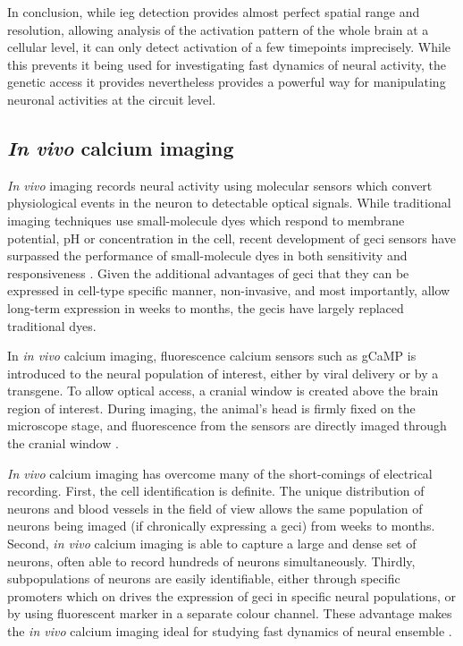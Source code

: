In conclusion, while \gls{ieg} detection provides almost perfect spatial range and resolution, allowing analysis of the activation pattern of the whole brain at a cellular level, it can only detect activation of a few timepoints imprecisely. While this prevents it being used for investigating fast dynamics of neural activity, the genetic access it provides nevertheless provides a powerful way for manipulating neuronal activities at the circuit level.


\subsection{\textit{In vivo} calcium imaging}

\textit{In vivo} imaging records neural activity using molecular sensors which convert physiological events in the neuron to detectable optical signals. While traditional imaging techniques use small-molecule dyes which respond to membrane potential, pH or  concentration in the cell, recent development of \gls{geci}  sensors have surpassed the performance of small-molecule  dyes in both sensitivity and responsiveness \citep{lutcke13}. Given the additional advantages of \gls{geci} that they can be expressed in cell-type specific manner, non-invasive, and most importantly, allow long-term expression in weeks to months, the \glspl{geci} have largely replaced traditional dyes. 

In \textit{in vivo} calcium imaging, fluorescence calcium sensors such as gCaMP is introduced to the neural population of interest, either by viral delivery or by a transgene. To allow optical access, a cranial window is created above the brain region of interest. During imaging, the animal's head is firmly fixed on the microscope stage, and fluorescence from the sensors are directly imaged through the cranial window \citep{lutcke13, yang17}. 

\textit{In vivo} calcium imaging has overcome many of the short-comings of electrical recording. First, the cell identification is definite. The unique distribution of neurons and blood vessels in the field of view allows the same population of neurons being imaged (if chronically expressing a \gls{geci}) from weeks to months. Second, \textit{in vivo} calcium imaging is able to capture a large and dense set of neurons, often able to record hundreds of neurons simultaneously. Thirdly, subpopulations of neurons are easily identifiable, either through specific promoters which on drives the expression of \gls{geci} in specific neural populations, or by using fluorescent marker in a separate colour channel. These advantage makes the \textit{in vivo} calcium imaging ideal for studying fast dynamics of neural ensemble \citep{lutcke13}. 


